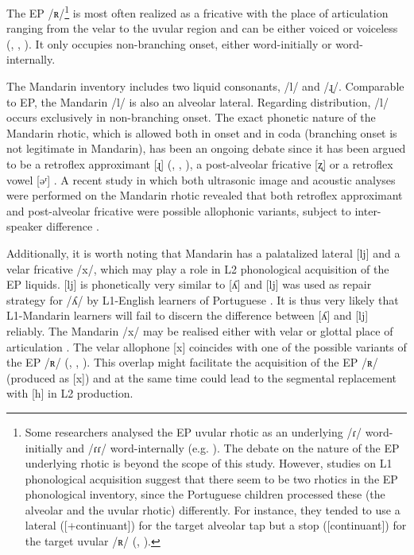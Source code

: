 \documentclass[output=paper]{../langscibook}
\begin{document}
The EP /ʀ/\footnote{\textrm{Some researchers analysed the EP uvular rhotic as an underlying /ɾ/ word-initially and /ɾɾ/ word-internally (e.g. \citealt{MateusAndrade2000}). The debate on the nature of the EP underlying rhotic is beyond the scope of this study. However, studies on L1 phonological acquisition suggest that there seem to be two rhotics in the EP phonological inventory, since the Portuguese children processed these (the alveolar and the uvular rhotic) differently. For instance, they tended to use a lateral ([+continuant]) for the target alveolar tap but a stop ([\textminus continuant]) for the target uvular /ʀ/ (\citealt{Amorim2014}, \citealt{Costa2010}).}}  is most often realized as a fricative with the place of articulation ranging from the velar to the uvular region and can be either voiced or voiceless (\citealt{RennickeMartins2013}, \citealt{Rodrigues2015}, \citealt{Pereira2020}). It only occupies non-branching onset, either word-initially or word-internally.

The Mandarin inventory includes two liquid consonants, /l/ and /ɻ/. Comparable to EP, the Mandarin /l/ is also an alveolar lateral. Regarding distribution, /l/ occurs exclusively in non-branching onset. The exact phonetic nature of the Mandarin rhotic, which is allowed both in onset and in coda (branching onset is not legitimate in Mandarin), has been an ongoing debate since it has been argued to be a retroflex approximant [ɻ] (\citealt{Duanmu2005}, \citealt{Lin2007}, \citealt{Zhu2007}), a post-alveolar fricative [ʐ] or a retroflex vowel [əʳ] \citep{Duanmu2007}. A recent study in which both ultrasonic image and acoustic analyses were performed on the Mandarin rhotic revealed that both retroflex approximant and post-alveolar fricative were possible allophonic variants, subject to inter-speaker difference \citep{Xing2019}.

Additionally, it is worth noting that Mandarin has a palatalized lateral [lj] and a velar fricative /x/, which may play a role in L2 phonological acquisition of the EP liquids. [lj] is phonetically very similar to [ʎ] and [lj] was used as repair strategy for /ʎ/ by L1-English learners of Portuguese \citep{OliveiraEtAl2016}. It is thus very likely that L1-Mandarin learners will fail to discern the difference between [ʎ] and [lj] reliably. The Mandarin /x/ may be realised either with velar or glottal place of articulation \citep{Lin2007}. The velar allophone [x] coincides with one of the possible variants of the EP /ʀ/ (\citealt{RennickeMartins2013}, \citealt{Rodrigues2015}, \citealt{Pereira2020}). This overlap might facilitate the acquisition of the EP /ʀ/ (produced as [x]) and at the same time could lead to the segmental replacement with [h] in L2 production.
\end{document}
